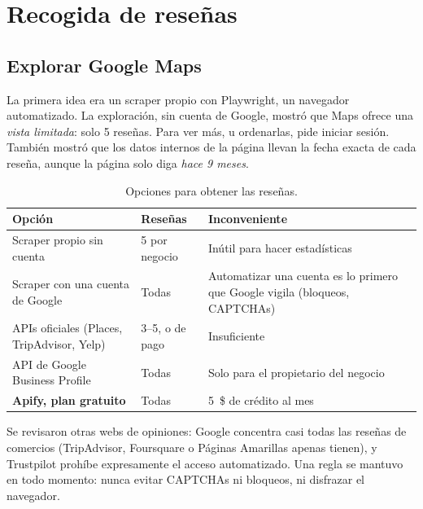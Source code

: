 \documentclass[11pt,a4paper]{article}
\begin{document}
\section{Recogida de reseñas}

\subsection{Explorar Google Maps}

La primera idea era un scraper propio con Playwright, un navegador automatizado. La exploración, sin cuenta de
Google, mostró que Maps ofrece una \emph{vista limitada}: solo 5 reseñas. Para ver más, u ordenarlas, pide iniciar
sesión. También mostró que los datos internos de la página llevan la fecha exacta de cada reseña, aunque la página
solo diga \emph{hace 9 meses}.

\begin{table}[htbp]
\centering\small
\caption{Opciones para obtener las reseñas.}
\label{tab:recogida}
\begin{tabularx}{\linewidth}{@{}l l X@{}}
\toprule
Opción & Reseñas & Inconveniente \\
\midrule
Scraper propio sin cuenta                 & 5 por negocio & Inútil para hacer estadísticas \\
Scraper con una cuenta de Google          & Todas         & Automatizar una cuenta es lo primero que Google vigila (bloqueos, CAPTCHAs) \\
APIs oficiales (Places, TripAdvisor, Yelp) & 3--5, o de pago & Insuficiente \\
API de Google Business Profile            & Todas         & Solo para el propietario del negocio \\
\textbf{Apify, plan gratuito}             & Todas         & 5~\$ de crédito al mes \\
\bottomrule
\end{tabularx}
\end{table}

Se revisaron otras webs de opiniones: Google concentra casi todas las reseñas de comercios (TripAdvisor,
Foursquare o Páginas Amarillas apenas tienen), y Trustpilot prohíbe expresamente el acceso automatizado. Una regla
se mantuvo en todo momento: nunca evitar CAPTCHAs ni bloqueos, ni disfrazar el navegador.
\end{document}
